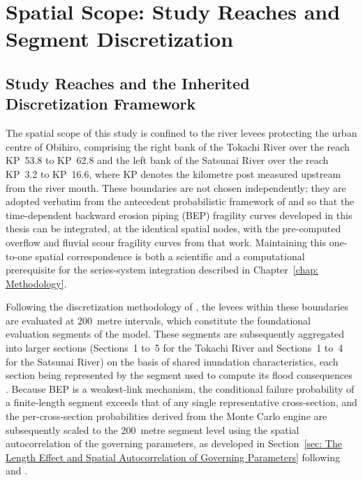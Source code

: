 \section{Spatial Scope: Study Reaches and Segment Discretization}
\label{sec: Spatial Scope: Study Reaches and Segment Discretization}

\subsection{Study Reaches and the Inherited Discretization Framework}
\label{subsec: Study Reaches and the Inherited Discretization Framework}

The spatial scope of this study is confined to the river levees protecting the urban centre of Obihiro, comprising the right bank of the Tokachi River over the reach KP~53.8 to KP~62.8 and the left bank of the Satsunai River over the reach KP~3.2 to KP~16.6, where KP denotes the kilometre post measured upstream from the river mouth. These boundaries are not chosen independently; they are adopted verbatim from the antecedent probabilistic framework of \textcite{uemura_phd_2025} and \textcite{uemura_wp2_2024} so that the time-dependent backward erosion piping (BEP) fragility curves developed in this thesis can be integrated, at the identical spatial nodes, with the pre-computed overflow and fluvial scour fragility curves from that work. Maintaining this one-to-one spatial correspondence is both a scientific and a computational prerequisite for the series-system integration described in Chapter~\ref{chap: Methodology}.

Following the discretization methodology of \textcite{uemura_wp2_2024}, the levees within these boundaries are evaluated at 200~metre intervals, which constitute the foundational evaluation segments of the model. These segments are subsequently aggregated into larger sections (Sections~1 to~5 for the Tokachi River and Sections~1 to~4 for the Satsunai River) on the basis of shared inundation characteristics, each section being represented by the segment used to compute its flood consequences \parencite{uemura_wp2_2024}. Because BEP is a weakest-link mechanism, the conditional failure probability of a finite-length segment exceeds that of any single representative cross-section, and the per-cross-section probabilities derived from the Monte Carlo engine are subsequently scaled to the 200~metre segment level using the spatial autocorrelation of the governing parameters, as developed in Section~\ref{sec: The Length Effect and Spatial Autocorrelation of Governing Parameters} following \textcite{kanning_2012} and \textcite{hoffmans_2014}.

